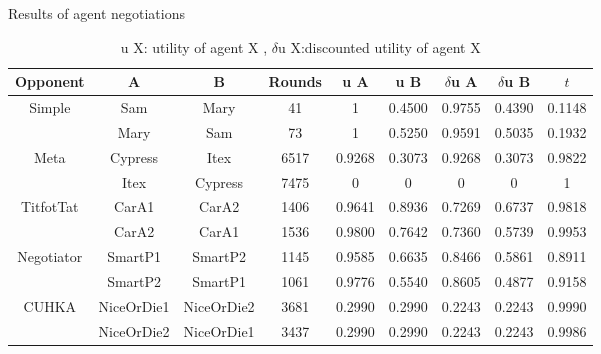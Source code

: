 \documentclass[html]{report}    %
\begin{document}
\begin{table}[ht] 
\centering %
\caption{Results of agent negotiations} %
\begin{tabular}{ccccccccc} %
\toprule %
 Opponent & A  &  B & Rounds & u A & u B & $\delta$u A & $\delta$u B & $t$\\ [0.5ex] %
\midrule %
\multirow{2}{*}{Simple}&Sam&Mary&41&1&0.4500&0.9755&0.4390&0.1148\\
&Mary&Sam&73&1&0.5250&0.9591&0.5035&0.1932\\ 
\multirow{2}{*}{Meta}&Cypress&Itex&6517&0.9268&0.3073&0.9268&0.3073&0.9822\\
&Itex&Cypress&7475&0&0&0&0&1\\
\multirow{2}{*}{TitfotTat}&CarA1&CarA2&1406&0.9641&0.8936&0.7269&0.6737&0.9818\\
&CarA2&CarA1&1536&0.9800&0.7642&0.7360&0.5739&0.9953\\
\multirow{2}{*}{Negotiator}&SmartP1&SmartP2&1145&0.9585&0.6635&0.8466&0.5861&0.8911\\
&SmartP2&SmartP1&1061&0.9776&0.5540&0.8605&0.4877&0.9158\\
\multirow{2}{*}{CUHKA}&NiceOrDie1&NiceOrDie2&3681&0.2990&0.2990&0.2243&0.2243&0.9990\\
&NiceOrDie2&NiceOrDie1&3437&0.2990&0.2990&0.2243&0.2243&0.9986\\
[1ex] %
\bottomrule %
\end{tabular} 
\caption{u X: utility of agent X , $\delta$u X:discounted utility of agent X} %
\label{table:NegoSimpleresults} %
\end{table} 
\end{document}
